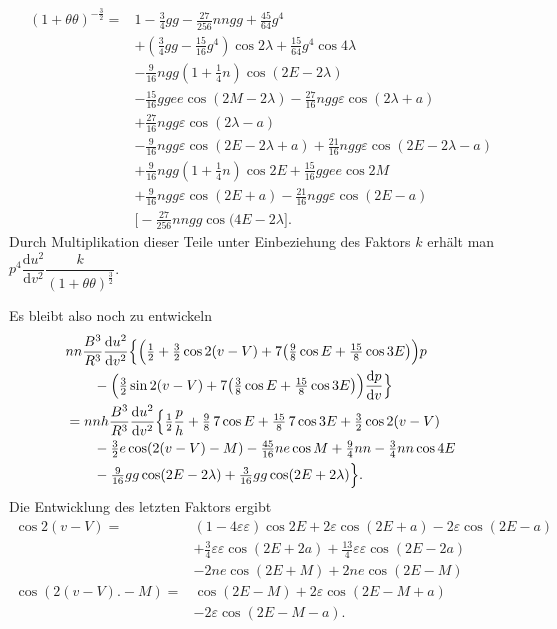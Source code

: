 \clearpage
\begingroup
{}
\renewcommand{\headrulewidth}{0pt}
\[
\begin{aligned}
(1+\theta\theta)^{-\frac32}
={}&1-\tfrac34gg-\tfrac{27}{256}nngg+\tfrac{45}{64}g^4\\
&+(\tfrac34gg-\tfrac{15}{16}g^4)\cos2\lambda
 +\tfrac{15}{64}g^4\cos4\lambda\\
&-\tfrac{9}{16}ngg(1+\tfrac14n)\cos(2E-2\lambda)\\
&-\tfrac{15}{16}ggee\cos(2M-2\lambda)
 -\tfrac{27}{16}ngg\varepsilon\cos(2\lambda+a)\\
&+\tfrac{27}{16}ngg\varepsilon\cos(2\lambda-a)\\
&-\tfrac{9}{16}ngg\varepsilon\cos(2E-2\lambda+a)
 +\tfrac{21}{16}ngg\varepsilon\cos(2E-2\lambda-a)\\
&+\tfrac{9}{16}ngg(1+\tfrac14n)\cos2E
 +\tfrac{15}{16}ggee\cos2M\\
&+\tfrac{9}{16}ngg\varepsilon\cos(2E+a)
 -\tfrac{21}{16}ngg\varepsilon\cos(2E-a)\\
&\bigl[-\tfrac{27}{256}nngg\cos(4E-2\lambda\bigr].
\end{aligned}
\]
\noindent Durch Multiplikation dieser Teile unter Einbeziehung des Faktors \(k\) erhält
man \(p^4\dfrac{\mathrm du^2}{\mathrm dv^2}\dfrac{k}{(1+\theta\theta)^{\frac32}}\).
\par\noindent\hspace*{\parindent}Es bleibt also noch zu entwickeln
\[
\begin{aligned}
&nn\frac{B^3}{R^3}\frac{\mathrm du^2}{\mathrm dv^2}
 \Bigl\{\Bigl(\tfrac12+\tfrac32\cos2(v-V)
 +7\bigl(\tfrac98\cos E+\tfrac{15}{8}\cos3E\bigr)\Bigr)p\\
&\qquad-\Bigl(\tfrac32\sin2(v-V)
 +7\bigl(\tfrac38\cos E+\tfrac{15}{8}\cos3E\bigr)\Bigr)
 \frac{\mathrm dp}{\mathrm dv}\Bigr\}\\
&=nnh\frac{B^3}{R^3}\frac{\mathrm du^2}{\mathrm dv^2}
 \Bigl\{\tfrac12\frac{p}{h}+\tfrac98\,7\cos E+\tfrac{15}{8}\,7\cos3E
 +\tfrac32\cos2(v-V)\\
&\qquad-\tfrac32e\cos(2(v-V)-M)-\tfrac{45}{16}ne\cos M
 +\tfrac94nn-\tfrac34nn\cos4E\\
&\qquad-\tfrac{9}{16}gg\cos(2E-2\lambda)
 +\tfrac{3}{16}gg\cos(2E+2\lambda)\Bigr\}.
\end{aligned}
\]
\noindent Die Entwicklung des letzten Faktors ergibt
\[
\begin{aligned}
\cos2(v-V)
={}&(1-4\varepsilon\varepsilon)\cos2E
 +2\varepsilon\cos(2E+a)-2\varepsilon\cos(2E-a)\\
&+\tfrac34\varepsilon\varepsilon\cos(2E+2a)
 +\tfrac{13}{4}\varepsilon\varepsilon\cos(2E-2a)\\
&-2ne\cos(2E+M)+2ne\cos(2E-M)\\
\cos(2(v-V)\mathord{.}-M)
={}&\cos(2E-M)+2\varepsilon\cos(2E-M+a)\\
&-2\varepsilon\cos(2E-M-a).
\end{aligned}
\]
